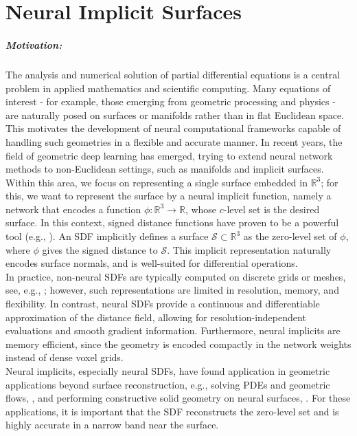 \documentclass[draft,12pt,openany]{book}
\newcommand{\R}{\mathbb{R}}
\def\S{\mathcal{S}}
\theoremstyle{plainnormal}
\theoremstyle{remark}
\begin{document}
\chapter{Neural Implicit Surfaces}\label{SectionNeuralImplicitSurf}
\paragraph*{Motivation:} 
The analysis and numerical solution of partial differential equations is a central problem in applied mathematics and scientific computing. Many equations of interest - for example, those emerging from geometric processing and physics - are naturally posed on surfaces or manifolds rather than in flat Euclidean space. This motivates the development of neural computational frameworks capable of handling such geometries in a flexible and accurate manner. In recent years, the field of geometric deep learning has emerged, trying to extend neural network methods to non-Euclidean settings, such as manifolds and implicit surfaces. \\
Within this area, we focus on representing a single surface embedded in $\R^3$; for this, we want to represent the surface by a neural implicit function, namely a network that encodes a function $\phi:\R^3\rightarrow\R$, whose $c$-level set is the desired surface. In this context, signed distance functions have proven to be a powerful tool (e.g., \cite{jiang2022sdfdiffdifferentiablerenderingsigned,survey_SDFs}). An SDF implicitly defines a surface $\mathcal S \subset \R^3$ as the zero-level set of $\phi$, where $\phi$ gives the signed distance to $\S$. This implicit representation naturally encodes surface normals, and is well-suited for differential operations.\\
In practice, non-neural SDFs are typically computed on discrete grids or meshes, see, e.g., \cite{FengCrane}; however, such representations are limited in resolution, memory, and flexibility. In contrast, neural SDFs provide a continuous and differentiable approximation of the distance field, allowing for resolution-independent evaluations and smooth gradient information. Furthermore, neural implicits are memory efficient, since the geometry is encoded compactly in the network weights instead of dense voxel grids.\\
Neural implicits, especially neural SDFs, have found application in geometric applications beyond surface reconstruction, e.g., solving PDEs and geometric flows, \cite{mehta2022levelsettheoryneural}, and performing constructive solid geometry on neural surfaces, \cite{marschner2023constructive}.  For these applications, it is important that the SDF reconstructs the zero-level set and is highly accurate in a narrow band near the surface.\\
\end{document}
